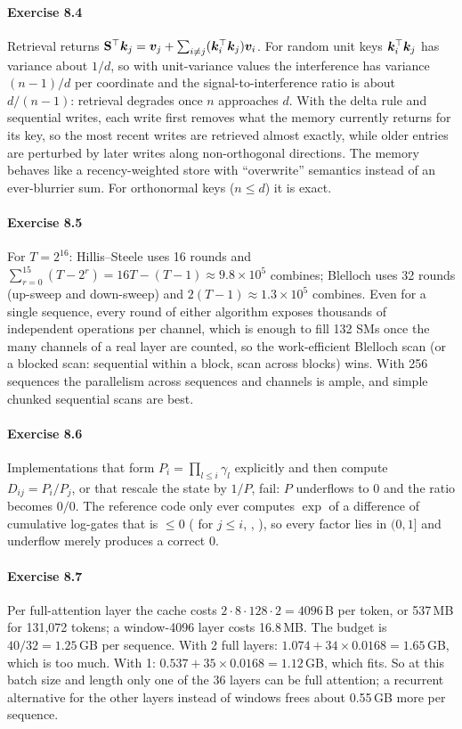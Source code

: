 \paragraph{Exercise 8.4} Retrieval returns $\mathbf{S}^\top\bm{k}_j=\bm{v}_j+\sum_{i\neq j}(\bm{k}_i^\top\bm{k}_j)\bm{v}_i$.
For random unit keys $\bm{k}_i^\top\bm{k}_j$ has variance about $1/d$, so with unit-variance values the
interference has variance $(n-1)/d$ per coordinate and the signal-to-interference ratio is about $d/(n-1)$:
retrieval degrades once $n$ approaches $d$. With the delta rule and sequential writes, each write first
removes what the memory currently returns for its key, so the most recent writes are retrieved almost
exactly, while older entries are perturbed by later writes along non-orthogonal directions. The memory
behaves like a recency-weighted store with ``overwrite'' semantics instead of an ever-blurrier sum. For
orthonormal keys ($n\le d$) it is exact.

\paragraph{Exercise 8.5} For $T=2^{16}$: Hillis--Steele uses 16 rounds and $\sum_{r=0}^{15}(T-2^r)=16T-(T-1)\approx9.8\times10^5$
combines; Blelloch uses 32 rounds (up-sweep and down-sweep) and $2(T-1)\approx1.3\times10^5$ combines. Even
for a single sequence, every round of either algorithm exposes thousands of independent operations per
channel, which is enough to fill 132 SMs once the many channels of a real layer are counted, so the
work-efficient Blelloch scan (or a blocked scan: sequential within a block, scan across blocks) wins. With 256
sequences the parallelism across sequences and channels is ample, and simple chunked sequential scans are
best.

\paragraph{Exercise 8.6} Implementations that form $P_i=\prod_{l\le i}\gamma_l$ explicitly and then compute
$D_{ij}=P_i/P_j$, or that rescale the state by $1/P$, fail: $P$ underflows to 0 and the ratio becomes $0/0$.
The reference code only ever computes $\exp$ of a difference of cumulative log-gates that is
$\le0$ ( for $j\le i$, , ), so every factor lies in
$(0,1]$ and underflow merely produces a correct 0.

\paragraph{Exercise 8.7} Per full-attention layer the cache costs $2\cdot8\cdot128\cdot2=4096$\,B per token, or
537\,MB for 131{,}072 tokens; a window-4096 layer costs 16.8\,MB. The budget is $40/32=1.25$\,GB per sequence.
With 2 full layers: $1.074+34\times0.0168=1.65$\,GB, which is too much. With 1: $0.537+35\times0.0168=1.12$\,GB,
which fits. So at this batch size and length only one of the 36 layers can be full attention; a
recurrent alternative for the other layers instead of windows frees about 0.55\,GB more per sequence.

